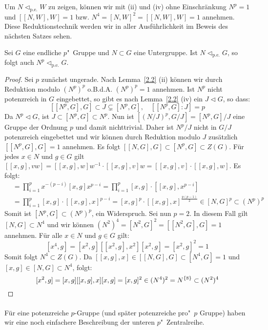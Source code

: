 \documentclass[11pt,a4paper,openany]{memoir}
\begin{document}
\begin{remark}
Um $N\lhd_\text{p.e.}W$ zu zeigen, können wir mit (ii) und (iv) ohne Einschränkung $N^p=1$ und $[[N,W],W]=1$ bzw. $N^4=[N,W]^2=[[N,W],W]=1$ annehmen. Diese Reduktionstechnik werden wir in aller Ausführlichkeit im Beweis des nächsten Satzes sehen.
\end{remark}

\begin{proposition}\label{2.3}
Sei $G$ eine endliche $p$"~Gruppe und $N\subset G$ eine Untergruppe. Ist $N\lhd_\text{p.e.}G$, so folgt auch $N^p\lhd_\text{p.e.}G$.
\end{proposition}

\begin{proof}
Sei $p$ zunächst ungerade. Nach Lemma~\ref{2.2} (ii) können wir durch Reduktion modulo $(N^p)^p$ o.B.d.A. $(N^p)^p=1$ annehmen. Ist $N^p$ nicht potenzreich in $G$ eingebettet, so gibt es nach Lemma~\ref{2.2} (iv) ein $J\lhd G$, so dass:
\[ [[N^p,G],G]\subset J\subsetneq [N^p,G],\quad [[N^p,G]:J]=p \]
Da $N^p\lhd G$, ist $J\subset[N^p,G]\subset N^p$. Nun ist $[(N/J)^p, G/J]= [N^p,G]/J$ eine Gruppe der Ordnung $p$ und damit nichttrivial. Daher ist $N^p/J$ nicht in $G/J$ potenzreich eingebettet und wir können durch Reduktion modulo $J$ zusätzlich $[[N^p,G],G]=1$ annehmen. Es folgt $[[N,G],G]\subset [N^p,G]\subset Z(G)$. Für jedes $x\in N$ und $g\in G$ gilt $[[x,g],vw]=[[x,g],w]w^{-1}\cdot [[x,g],v]w=[[x,g],v]\cdot[[x,g],w]$. Es folgt:
\begin{align*}
[x^p,g] &=\prod_{i=1}^p x^{-(p-i)}[x,g]x^{p-i}= \prod_{i=1}^p [x,g] \cdot[[x,g],x^{p-i}]\\
&=\prod_{i=1}^p [x,g]\cdot [[x,g],x]^{p-i}= [x,g]^p\cdot [[x,g],x]^\frac{p(p-1)}{2}\in [N,G]^p\subset (N^p)^p
\end{align*}
Somit ist $[N^p,G]\subset (N^p)^p$, ein Widerspruch. Sei nun $p=2$. In diesem Fall gilt $[N,G]\subset N^4$ und wir können $(N^2)^4 = [N^2,G]^2= [[N^2,G],G]=1$ annehmen. Für alle $x\in N$ und $g\in G$ gilt:
\[[x^4,g]=[x^2,g][[x^2,g],x^2][x^2,g]=[x^2,g]^2=1 \]
Somit folgt $N^4\subset Z(G)$. Da $[[x,g],x]\in [[N,G],G]\subset [N^4,G]=1$ und $[x,g]\in[N,G]\subset N^4$, folgt:
\[[x^2,g]=[x,g][[x,g],x][x,g]=[x,g]^2\in (N^4)^2=N^{\{8\}}\subset (N^2)^4\qedhere \]
\end{proof}

\paragraph{} Für eine potenzreiche $p$-Gruppe (und später potenzreiche pro"~$p$ Gruppe) haben wir eine noch einfachere Beschreibung der unteren $p$"~Zentralreihe.
\end{document}
